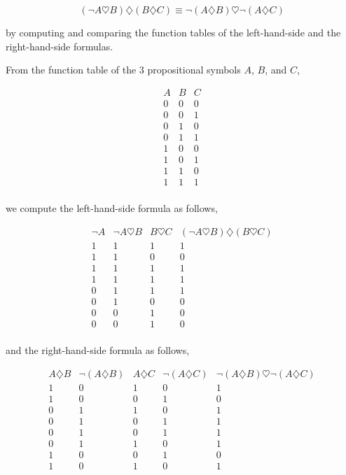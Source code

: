 \documentclass[unicode,11pt,a4paper,oneside,numbers=endperiod,openany]{scrartcl}
\begin{document}
\[
(\neg A \heartsuit B) \diamondsuit (B \diamondsuit C) 
\equiv 
\neg(A \diamondsuit B) \heartsuit \neg(A \diamondsuit C)
\]

\noindent by computing and comparing the function tables of the left-hand-side 
and the right-hand-side formulas.
\\\newline

From the function table of the 3 propositional symbols \( A \), \( B \), and \( C \),

\[
\begin{array}{c|c|c}
A & B & C \\
\hline
0 & 0 & 0 \\
0 & 0 & 1 \\
0 & 1 & 0 \\
0 & 1 & 1 \\
1 & 0 & 0 \\
1 & 0 & 1 \\
1 & 1 & 0 \\
1 & 1 & 1 \\
\end{array}
\]

we compute the left-hand-side formula as follows,

\[
\begin{array}{c|c|c|c}
\neg A 
& \neg A \heartsuit B 
& B \heartsuit C 
& (\neg A \heartsuit B) \diamondsuit (B \heartsuit C) \\
\hline
1 & 1 & 1 & 1 \\
1 & 1 & 0 & 0 \\
1 & 1 & 1 & 1 \\
1 & 1 & 1 & 1 \\
0 & 1 & 1 & 1 \\
0 & 1 & 0 & 0 \\
0 & 0 & 1 & 0 \\
0 & 0 & 1 & 0 \\
\end{array}
\]

and the right-hand-side formula as follows,

\[
\begin{array}{c|c|c|c|c}
A \diamondsuit B 
& \neg (A \diamondsuit B) 
& A \diamondsuit C 
& \neg (A \diamondsuit C) 
& \neg (A \diamondsuit B) \heartsuit \neg (A \diamondsuit C) \\
\hline
1 & 0 & 1 & 0 & 1 \\
1 & 0 & 0 & 1 & 0 \\
0 & 1 & 1 & 0 & 1 \\
0 & 1 & 0 & 1 & 1 \\
0 & 1 & 0 & 1 & 1 \\
0 & 1 & 1 & 0 & 1 \\
1 & 0 & 0 & 1 & 0 \\
1 & 0 & 1 & 0 & 1 \\
\end{array}
\]
\end{document}
